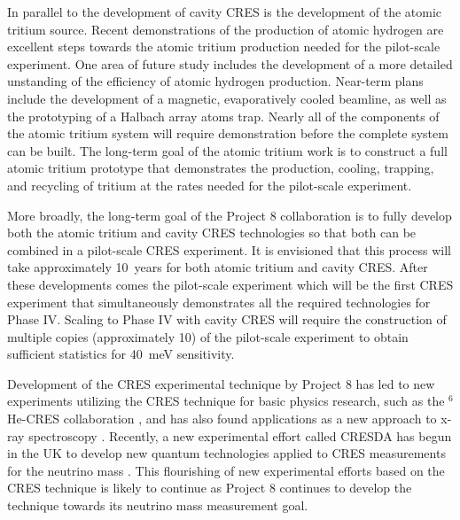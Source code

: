 In parallel to the development of cavity CRES is the development of the atomic tritium source. Recent demonstrations of the production of atomic hydrogen are excellent steps towards the atomic tritium production needed for the pilot-scale experiment. One area of future study includes the development of a more detailed unstanding of the efficiency of atomic hydrogen production. Near-term plans include the development of a magnetic, evaporatively cooled beamline, as well as the prototyping of a Halbach array atoms trap. Nearly all of the components of the atomic tritium system will require demonstration before the complete system can be built. The long-term goal of the atomic tritium work is to construct a full atomic tritium prototype that demonstrates the production, cooling, trapping, and recycling of tritium at the rates needed for the pilot-scale experiment.

More broadly, the long-term goal of the Project 8 collaboration is to fully develop both the atomic tritium and cavity CRES technologies so that both can be combined in a pilot-scale CRES experiment. It is envisioned that this process will take approximately 10~years for both atomic tritium and cavity CRES. After these developments comes the pilot-scale experiment which will be the first CRES experiment that simultaneously demonstrates all the required technologies for Phase IV. Scaling to Phase IV with cavity CRES will require the construction of multiple copies (approximately 10) of the pilot-scale experiment to obtain sufficient statistics for 40~meV sensitivity.

Development of the CRES experimental technique by Project 8 has led to new experiments utilizing the CRES technique for basic physics research, such as the $^6$He-CRES collaboration \cite{cresHe6}, and has also found applications as a new approach to x-ray spectroscopy \cite{cresXrayKazkaz}. Recently, a new experimental effort called CRESDA has begun in the UK to develop new quantum technologies applied to CRES measurements for the neutrino mass \cite{cresda}. This flourishing of new experimental efforts based on the CRES technique is likely to continue as Project 8 continues to develop the technique towards its neutrino mass measurement goal.

